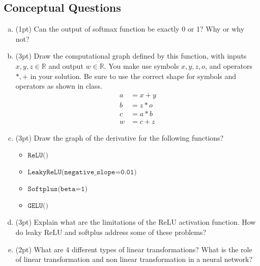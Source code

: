 \documentclass{article}
\begin{document}
\subsection{Conceptual Questions}

\begin{enumerate}[(a)]
    \item (1pt) Can the output of softmax function be exactly 0 or 1? Why or why not?
    
    
    \item (3pt) Draw the computational graph defined by this function, with inputs $x, y, z \in \mathbb{R}$ and output $w\in\mathbb{R}$.
    			You make use symbols $x, y, z, o$, and operators $*, +$ in your solution.
    			Be sure to use the correct shape for symbols and operators as shown in class.
    \begin{align*}
        a &= x + y\\
        b &= z * o \\
        c &= a * b \\
        w &= c + z
    \end{align*}
    
    \newpage
    
    \item (3pt) Draw the graph of the derivative for the following functions?
    \begin{itemize}
        \item $\texttt{ReLU()}$
        \item $\texttt{LeakyReLU(negative\_slope=0.01)}$
        \item $\texttt{Softplus(beta=1)}$
        \item $\texttt{GELU()}$
    \end{itemize}

    \newpage

    \item (3pt) Explain what are the limitations of the ReLU activation function. How do leaky ReLU and softplus address some of these problems? \\
    
    \item (2pt) What are 4 different types of linear transformations? What is the role of linear transformation and non linear transformation in a neural network?
    

    
\end{enumerate}
\end{document}
